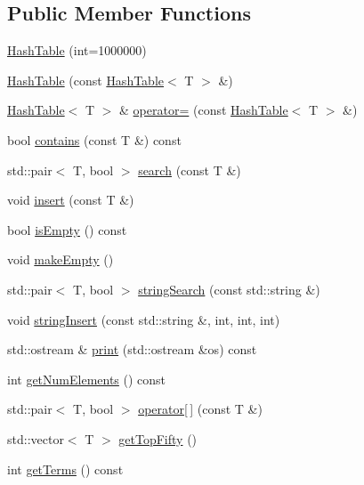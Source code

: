 \subsection*{Public Member Functions}
\begin{DoxyCompactItemize}
\item 
\mbox{\hyperlink{classHashTable_aaf597eeb450b75345dc8ec5061429d66}{Hash\+Table}} (int=1000000)
\item 
\mbox{\hyperlink{classHashTable_a4acb9708dd46d79a1a2aa45a64977a8b}{Hash\+Table}} (const \mbox{\hyperlink{classHashTable}{Hash\+Table}}$<$ T $>$ \&)
\item 
\mbox{\hyperlink{classHashTable}{Hash\+Table}}$<$ T $>$ \& \mbox{\hyperlink{classHashTable_a7db250d46e886751910efdb0e0ac7aad}{operator=}} (const \mbox{\hyperlink{classHashTable}{Hash\+Table}}$<$ T $>$ \&)
\item 
bool \mbox{\hyperlink{classHashTable_ae30d145ec5047b093d27b7b7038a45fa}{contains}} (const T \&) const
\item 
std\+::pair$<$ T, bool $>$ \mbox{\hyperlink{classHashTable_abcc2c56c62a636f9163d934aa6881c57}{search}} (const T \&)
\item 
void \mbox{\hyperlink{classHashTable_a678593aba9238850142914bca5f97158}{insert}} (const T \&)
\item 
bool \mbox{\hyperlink{classHashTable_a3e2bab230f4dd25ba9510f49c5be2b36}{is\+Empty}} () const
\item 
void \mbox{\hyperlink{classHashTable_aaed86109363c5412e7aeebeb0200fe44}{make\+Empty}} ()
\item 
std\+::pair$<$ T, bool $>$ \mbox{\hyperlink{classHashTable_a801997e4fd99d4054bbdff4002e6e63d}{string\+Search}} (const std\+::string \&)
\item 
void \mbox{\hyperlink{classHashTable_a48094fe05d264dcc5f2292b8ca7e2a4c}{string\+Insert}} (const std\+::string \&, int, int, int)
\item 
std\+::ostream \& \mbox{\hyperlink{classHashTable_a925e5d133027e366e6a05d584a04a92c}{print}} (std\+::ostream \&os) const
\item 
int \mbox{\hyperlink{classHashTable_a8b8869f3dc1b79fd2c4fb6488a44926c}{get\+Num\+Elements}} () const
\item 
std\+::pair$<$ T, bool $>$ \mbox{\hyperlink{classHashTable_a97088b8890aa3ef1403359d45b6260ce}{operator\mbox{[}$\,$\mbox{]}}} (const T \&)
\item 
std\+::vector$<$ T $>$ \mbox{\hyperlink{classHashTable_a6f5359b3b5b29414ef07fcb202b0ed28}{get\+Top\+Fifty}} ()
\item 
int \mbox{\hyperlink{classHashTable_a1da70d706b97754c2bd359d2f512b087}{get\+Terms}} () const
\end{DoxyCompactItemize}
